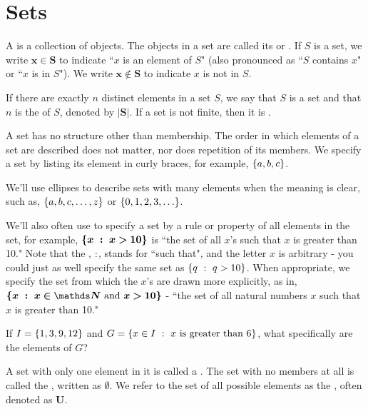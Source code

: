 
\section{Sets}

\begin{defn}[Sets]
A  is a collection of objects. The objects in a set are called its  or . If $S$ is a set, we write $\bm{x \in S}$ to indicate ``$x$ is an element of $S$" (also pronounced as ``$S$ contains $x$" or ``$x$ is in $S$"). We write $\bm{x \notin S}$ to indicate $x$ is not in $S$.

If there are exactly $n$ distinct elements in a set $S$, we say that $S$ is a  set and that $n$ is the  of $S$, denoted by $\bm{|S|}$. If a set is not finite, then it is .
\end{defn}

\begin{discussion}
A set has no structure other than membership. The order in which elements of a set are described does not matter, nor does repetition of its members. We specify a set by listing its element in curly braces, for example, $\left\lbrace a, b, c \right\rbrace$. 

We'll use ellipses to describe sets with many elements when the meaning is clear, such as, $\left\lbrace a, b, c, \ldots, z \right\rbrace$ or $\left\lbrace 0, 1, 2, 3, \ldots \right\rbrace$. 

We'll also often use  to specify a set by a rule or property of all elements in the set, for example, $\bm{\left\lbrace x\ :\ x > 10 \right\rbrace}$  is ``the set of all $x$'s such that $x$ is greater than 10." Note that the \setbuildsepname, $:$, stands for ``such that", and the letter $x$ is arbitrary - you could just as well specify the same set as $\left\lbrace q\ :\ q > 10 \right\rbrace$. When appropriate, we specify the set from which the $x$'s are drawn more explicitly, as in, $\bm{\setbuild{x}{x \in \naturals~\textrm{and}~x > 10}}$ - ``the set of all natural numbers $x$ such that $x$ is greater than 10."
\end{discussion}

\begin{exer1}
If $I = \left\lbrace 1, 3, 9, 12 \right\rbrace$ and $G = \left\lbrace x \in I\ :\ x~\textrm{is greater than 6} \right\rbrace$, what specifically are the elements of $G$?
\end{exer1}

\begin{defn}
A set with only one element in it is called a . The set with no members at all is called the , written as $\bm{\emptyset}$. We refer to the set of all possible elements as the , often denoted as $\bm U$.
\end{defn}

